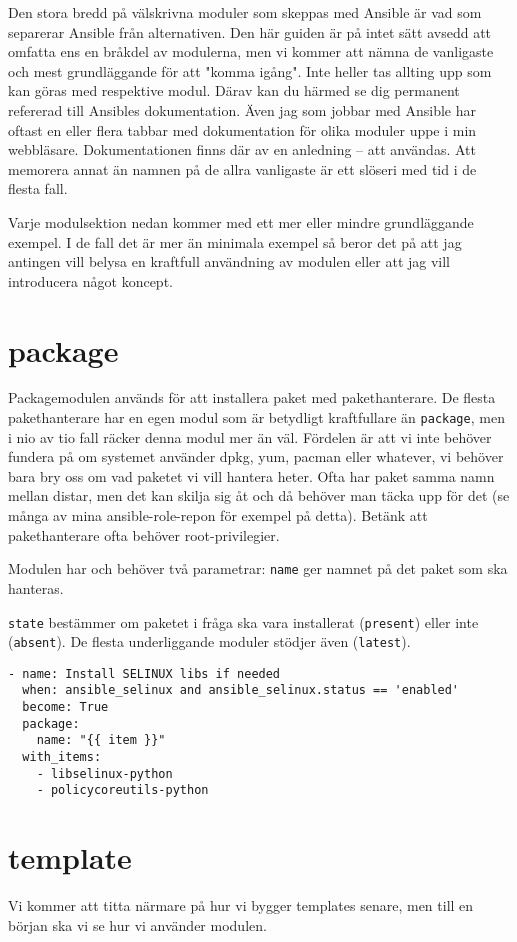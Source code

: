 Den stora bredd på välskrivna moduler som skeppas med Ansible är vad som separerar Ansible från alternativen.
Den här guiden är på intet sätt avsedd att omfatta ens en bråkdel av modulerna, men vi kommer att nämna de
vanligaste och mest grundläggande för att "komma igång". Inte heller tas allting upp som kan göras med respektive
modul. Därav kan du härmed se dig permanent refererad till Ansibles dokumentation. Även jag som jobbar med
Ansible har oftast en eller flera tabbar med dokumentation för olika moduler uppe i min webbläsare. 
Dokumentationen finns där av en anledning -- att användas. Att memorera annat än namnen på de allra vanligaste är
ett slöseri med tid i de flesta fall.

Varje modulsektion nedan kommer med ett mer eller mindre grundläggande exempel. I de fall det är mer än minimala
exempel så beror det på att jag antingen vill belysa en kraftfull användning av modulen eller att jag vill introducera något koncept.

\section{package}
Packagemodulen används för att installera paket med pakethanterare. De flesta pakethanterare har en egen modul som
är betydligt kraftfullare än \texttt{package}, men i nio av tio fall räcker denna modul mer än väl. Fördelen är att
vi inte behöver fundera på om systemet använder dpkg, yum, pacman eller whatever, vi behöver bara bry oss om vad 
paketet vi vill hantera heter. Ofta har paket samma namn mellan distar, men det kan skilja sig åt och då behöver
man täcka upp för det (se många av mina ansible-role-repon för exempel på detta). Betänk att pakethanterare ofta
behöver root-privilegier.

Modulen har och behöver två parametrar:
\texttt{name} ger namnet på det paket som ska hanteras.

\texttt{state} bestämmer om paketet i fråga ska vara installerat (\texttt{present}) eller inte (\texttt{absent}). De
flesta underliggande moduler stödjer även (\texttt{latest}).

\begin{verbatim}
- name: Install SELINUX libs if needed
  when: ansible_selinux and ansible_selinux.status == 'enabled'
  become: True
  package:
    name: "{{ item }}"
  with_items:
    - libselinux-python
    - policycoreutils-python
\end{verbatim}


\section{template}
Vi kommer att titta närmare på hur vi bygger templates senare, men till en början ska vi se hur vi använder modulen.

